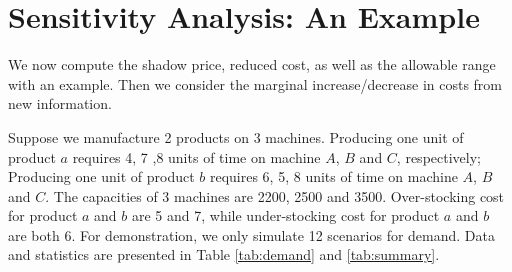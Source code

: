 \documentclass[a4paper,11pt]{article}
\begin{document}
\section{Sensitivity Analysis: An Example}
\label{se:sensitivity}

We now compute the shadow price, reduced cost, as well as the allowable range with an example. Then we consider the marginal increase/decrease in costs from new information.

\begin{table}[h]
\caption{Demand Realisations: Example}
\label{tab:demand}
\centering
{}
\end{table}

\begin{table}[h]
\caption{Demand Realisations: Statistical Summary}
\label{tab:summary}
\centering
{}
\end{table}

Suppose we manufacture 2 products on 3 machines. Producing one unit of product $a$ requires 4, 7 ,8 units of time on machine $A$, $B$ and $C$, respectively; Producing one unit of product $b$ requires 6, 5, 8 units of time on machine $A$, $B$ and $C$. The capacities of 3 machines are 2200, 2500 and 3500. Over-stocking cost for product $a$ and $b$ are 5 and 7, while under-stocking cost for product $a$ and $b$ are both 6. For demonstration, we only simulate 12 scenarios for demand. Data and statistics are presented in Table \ref{tab:demand} and \ref{tab:summary}.
\end{document}
